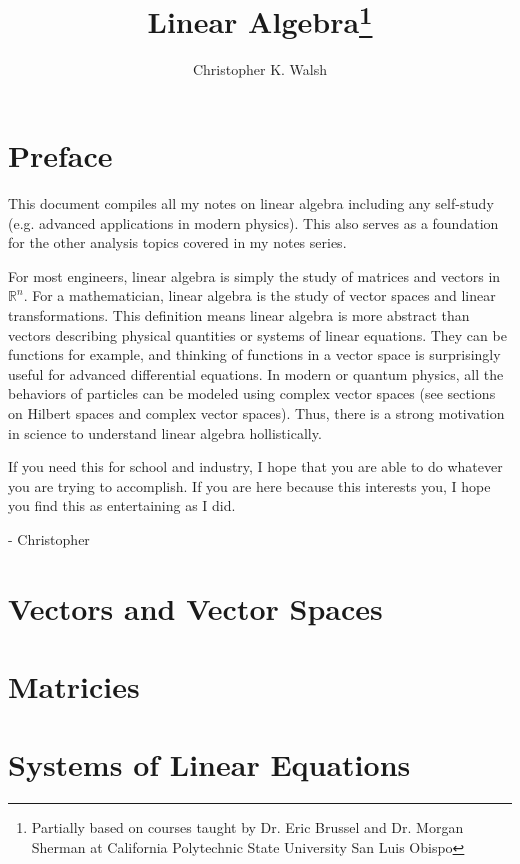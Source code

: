 \documentclass[12pt,openany]{book}
\title{Linear Algebra\thanks{Partially based on courses taught by Dr. Eric Brussel and Dr. Morgan Sherman at California Polytechnic State University San Luis Obispo}}
\author{Christopher K. Walsh}
\theoremstyle{mydefinitionstyle}
\theoremstyle{myexamplestyle}
\theoremstyle{remark}
\begin{document}
\maketitle
\tableofcontents

\newpage
\chapter*{Preface}
This document compiles all my notes on linear algebra including any self-study (e.g. advanced applications in modern physics).
This also serves as a foundation for the other analysis topics covered in my notes series.

For most engineers, linear algebra is simply the study of matrices and vectors in \( \mathbb{R}^n \).
For a mathematician, linear algebra is the study of vector spaces and linear transformations.
This definition means linear algebra is more abstract than vectors describing physical quantities or systems of linear equations.
They can be functions for example, and thinking of functions in a vector space is surprisingly useful for advanced differential equations.
In modern or quantum physics, all the behaviors of particles can be modeled using complex vector spaces (see sections on Hilbert spaces and complex vector spaces).
Thus, there is a strong motivation in science to understand linear algebra hollistically.

If you need this for school and industry, I hope that you are able to do whatever you are trying to accomplish.
If you are here because this interests you, I hope you find this as entertaining as I did.

- Christopher


\chapter{Vectors and Vector Spaces}



\chapter{Matricies}


\chapter{Systems of Linear Equations}

\end{document}
